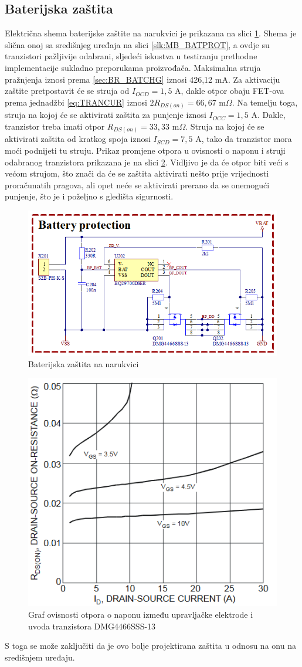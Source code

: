 \subsection{Baterijska zaštita}
\sloppy Električna shema baterijske zaštite na narukvici je prikazana na slici \ref{slk:BR_BATPROT}. Shema je slična onoj sa središnjeg uređaja na slici \ref{slk:MB_BATPROT}, a ovdje su tranzistori pažljivije odabrani, sljedeći iskustva u testiranju prethodne implementacije sukladno preporukama proizvođača. Maksimalna struja pražnjenja iznosi prema \ref{sec:BR_BATCHG} iznosi 426,12 mA. Za aktivaciju zaštite pretpostavit će se struja od $I_{OCD}=1,5\textrm{ A}$, dakle otpor obaju FET-ova prema jednadžbi \ref{eq:TRANCUR} iznosi ${2R_{DS(on)}=66,67\textrm{ m}\Omega}$. Na temelju toga, struja na kojoj će se aktivirati zaštita za punjenje iznosi $I_{OCC}=1,5\textrm{ A}$. Dakle, tranzistor treba imati otpor $R_{DS(on)}=33,33\textrm{ m}\Omega$. Struja na kojoj će se aktivirati zaštita od kratkog spoja iznosi $I_{SCD}=7,5\textrm{ A}$, tako da tranzistor mora moći podnijeti tu struju. Prikaz promjene otpora u ovisnosti o naponu i struji odabranog tranzistora prikazana je na slici \ref{slk:RDS_NEW}. Vidljivo je da će otpor biti veći s većom strujom, što znači da će se zaštita aktivirati nešto prije vrijednosti proračunatih pragova, ali opet neće se aktivirati prerano da se onemogući punjenje, što je i poželjno s gledišta sigurnosti.
\begin{figure}[htb]
    \centering
    \includegraphics[width=10 cm]{Figures/BR_BATPROT.png}
    \caption{Baterijska zaštita na narukvici}
    \label{slk:BR_BATPROT}
\end{figure}
\begin{figure}[h!tb]
    \centering
    \includegraphics[width=6 cm]{Figures/RDS_NEW.PNG}
    \caption{Graf ovisnosti otpora o naponu između upravljačke elektrode i uvoda tranzistora DMG4466SSS-13 \cite{di:dmg4466}}
    \label{slk:RDS_NEW}
\end{figure}
S toga se može zaključiti da je ovo bolje projektirana zaštita u odnosu na onu na središnjem uređaju.

